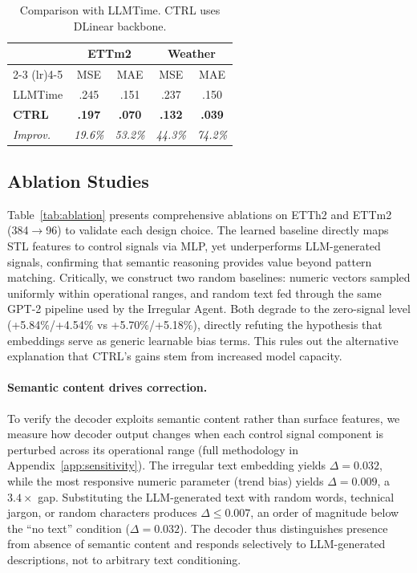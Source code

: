 \begin{table}[h!]
\centering
\footnotesize
\setlength{\tabcolsep}{3.9pt}
\begin{tabular}{lcccc}
\toprule
 & \multicolumn{2}{c}{\textbf{ETTm2}} & \multicolumn{2}{c}{\textbf{Weather}} \\
\cmidrule(lr){2-3} \cmidrule(lr){4-5}
 & MSE & MAE & MSE & MAE \\
\midrule
LLMTime & .245 & .151 & .237 & .150 \\
\textbf{CTRL} & \textbf{.197} & \textbf{.070} & \textbf{.132} & \textbf{.039} \\
\midrule
\textit{Improv.} & \textit{19.6\%} & \textit{53.2\%} & \textit{44.3\%} & \textit{74.2\%} \\
\bottomrule
\end{tabular}
\caption{Comparison with LLMTime. CTRL uses DLinear backbone.}
\label{tab:llmtime}
\end{table}

\subsection{Ablation Studies}
\label{sec:ablation}




Table~\ref{tab:ablation} presents comprehensive ablations on ETTh2 and ETTm2 (384$\rightarrow$96) to validate each design choice.
The learned baseline directly maps STL features to control signals via MLP, yet underperforms LLM-generated signals, confirming that semantic reasoning provides value beyond pattern matching. Critically, we construct two random baselines: numeric vectors sampled uniformly within operational ranges, and random text fed through the same GPT-2 pipeline used by the Irregular Agent. Both degrade to the zero-signal level (+5.84\%/+4.54\% vs +5.70\%/+5.18\%), directly refuting the hypothesis that embeddings serve as generic learnable bias terms. This rules out the alternative explanation that CTRL's gains stem from increased model capacity.

\paragraph{Semantic content drives correction.} To verify the decoder exploits semantic content rather than surface features, we measure how decoder output changes when each control signal component is perturbed across its operational range (full methodology in Appendix~\ref{app:sensitivity}). The irregular text embedding yields $\Delta = 0.032$, while the most responsive numeric parameter (trend bias) yields $\Delta = 0.009$, a $3.4\times$ gap. Substituting the LLM-generated text with random words, technical jargon, or random characters produces $\Delta \leq 0.007$, an order of magnitude below the ``no text'' condition ($\Delta = 0.032$). The decoder thus distinguishes presence from absence of semantic content and responds selectively to LLM-generated descriptions, not to arbitrary text conditioning.

